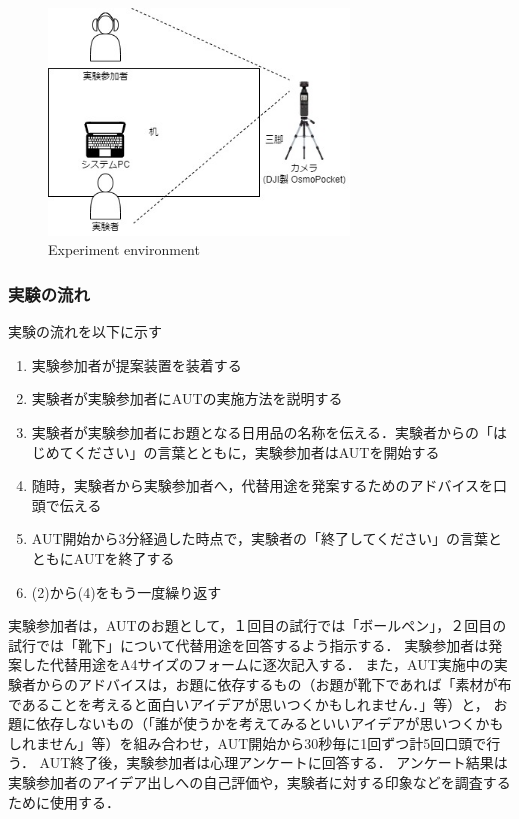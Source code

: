 \documentclass[a4paper]{jarticle}
\begin{document}
\begin{figure}[htbp]
    \begin{center}
    \includegraphics[width=80mm]{configuration.jpg}
    \caption{Experiment environment}
    \label{fig:env}
    \end{center}
    \end{figure}
\subsubsection{実験の流れ}
実験の流れを以下に示す
\begin{enumerate}
    \item 実験参加者が提案装置を装着する
    \item 実験者が実験参加者にAUTの実施方法を説明する
    \item 実験者が実験参加者にお題となる日用品の名称を伝える．実験者からの「はじめてください」の言葉とともに，実験参加者はAUTを開始する
    \item 随時，実験者から実験参加者へ，代替用途を発案するためのアドバイスを口頭で伝える
    \item AUT開始から3分経過した時点で，実験者の「終了してください」の言葉とともにAUTを終了する
    \item (2)から(4)をもう一度繰り返す
\end{enumerate}
実験参加者は，AUTのお題として，１回目の試行では「ボールペン」，２回目の試行では「靴下」について代替用途を回答するよう指示する．
実験参加者は発案した代替用途をA4サイズのフォームに逐次記入する．
また，AUT実施中の実験者からのアドバイスは，お題に依存するもの（お題が靴下であれば「素材が布であることを考えると面白いアイデアが思いつくかもしれません．」等）と，
お題に依存しないもの（「誰が使うかを考えてみるといいアイデアが思いつくかもしれません」等）を組み合わせ，AUT開始から30秒毎に1回ずつ計5回口頭で行う．
AUT終了後，実験参加者は心理アンケートに回答する．
アンケート結果は実験参加者のアイデア出しへの自己評価や，実験者に対する印象などを調査するために使用する．
\end{document}
